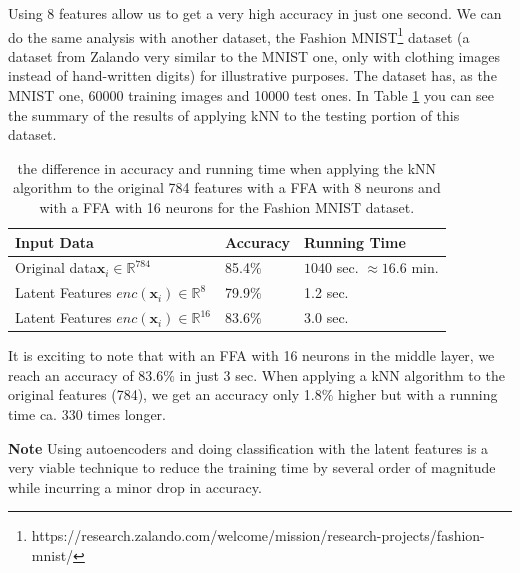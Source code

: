 \documentclass[12pt,a4]{article}
\newenvironment{note}
{\begin{mdframed}[backgroundcolor=light-gray, roundcorner=10pt,leftmargin=1, rightmargin=1, innerleftmargin=15, innertopmargin=15,innerbottommargin=15, outerlinewidth=1, linecolor=light-gray]}
{\end{mdframed}}
\begin{document}
Using \( 8\) features allow us to get a very high accuracy in just one second. 
We can do the same analysis with another dataset, the Fashion MNIST\footnote{ https://research.zalando.com/welcome/mission/research-projects/fashion-mnist/ } dataset (a dataset from Zalando very similar to the MNIST one, only with clothing images instead of hand-written digits) for illustrative purposes. The dataset has, as the MNIST one, 60000 training images and 10000 test ones. In Table \ref{tab:run2} you can see the summary of the results of applying kNN to the testing portion of this dataset.
\begin{table}[hbt]
\begin{adjustbox}{max width=\textwidth}
\begin{tabular}{p{4.89cm}p{4cm}p{4.59cm}}
\multicolumn{1}{p{4.9cm}}{Input Data} & 
\multicolumn{1}{p{4cm}}{Accuracy} & 
\multicolumn{1}{p{4.6cm}}{Running Time} \\ 
\hline
\multicolumn{1}{p{4.9cm}}{Original data\( \mathbf{x}_{i}\in\mathbb{R}^{784}\)} & 
\multicolumn{1}{p{4cm}}{85.4$\%$} & 
\multicolumn{1}{p{4.6cm}}{\( 1040\) sec. \( \approx 16.6\) min.} \\ 
\multicolumn{1}{p{4.9cm}}{Latent Features \( enc\left(\mathbf{x}_{i}\right)\in\mathbb{R}^{8}\)} & 
\multicolumn{1}{p{4cm}}{79.9$\%$} & 
\multicolumn{1}{p{4.6cm}}{1.2 sec.} \\ 
\multicolumn{1}{p{4.9cm}}{Latent Features \( enc\left(\mathbf{x}_{i}\right)\in\mathbb{R}^{16}\)} & 
\multicolumn{1}{p{4cm}}{83.6$\%$} & 
\multicolumn{1}{p{4.6cm}}{3.0 sec.} \\ 
\end{tabular}
\end{adjustbox}
\caption{the difference in accuracy and running time when applying the kNN algorithm to the original 784 features with a FFA with 8 neurons and with a FFA with 16 neurons for the Fashion MNIST dataset.}\label{tab:run2}
\end{table}
It is exciting to note that with an FFA with 16 neurons in the middle layer, we reach an accuracy of 83.6$\%$ in just 3 sec. When applying a kNN algorithm to the original features (784), we get an accuracy only 1.8$\%$ higher but with a running time ca. 330 times longer.
\begin{note}
\textbf{Note} Using autoencoders and doing classification with the latent features is a very viable technique to reduce the training time by several order of magnitude while incurring a minor drop in accuracy.
\end{note}
\end{document}
